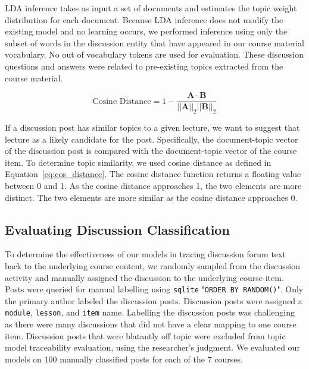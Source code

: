 \documentclass[sigconf, nonacm=true]{acmart}
\begin{document}
LDA inference takes as input a set of documents and estimates the topic weight distribution for each document.
Because LDA inference does not modify the existing model and no learning occurs, we performed inference using only the subset of words in the discussion entity that have appeared in our course material vocabulary.
No out of vocabulary tokens are used for evaluation.
These discussion questions and answers were related to pre-existing topics extracted from the course material.

\begin{equation}
    \text{Cosine Distance} = 1 - \frac {\pmb A \cdot \pmb B}{||\pmb A||_2 ||\pmb B||_2}
    \label{eq:cos_distance}
\end{equation}

If a discussion post has similar topics to a given lecture, we want to suggest that lecture as a likely candidate for the post.
Specifically, the document-topic vector of the discussion post is compared with the document-topic vector of the course item.
To determine topic similarity, we used cosine distance as defined in Equation~\ref{eq:cos_distance}.
The cosine distance function returns a floating value between 0 and 1. As the cosine distance approaches 1, the two elements are more distinct. The two elements are more similar as the cosine distance approaches 0.


\subsection{Evaluating Discussion Classification}


To determine the effectiveness of our models in tracing discussion forum text back to the underlying course content, we randomly sampled from the discussion activity and manually assigned the discussion to the underlying course item.
Posts were queried for manual labelling using \texttt{sqlite} "\texttt{ORDER BY RANDOM()}".
Only the primary author labeled the discussion posts.
Discussion posts were assigned a \texttt{module}, \texttt{lesson}, and \texttt{item} name.
Labelling the discussion posts was challenging as there were many discussions that did not have a clear mapping to one course item.
Discussion posts that were blatantly off topic were excluded from topic model traceability evaluation, using the researcher's judgment.
We evaluated our models on 100 manually classified posts for each of the 7 courses.
\end{document}
